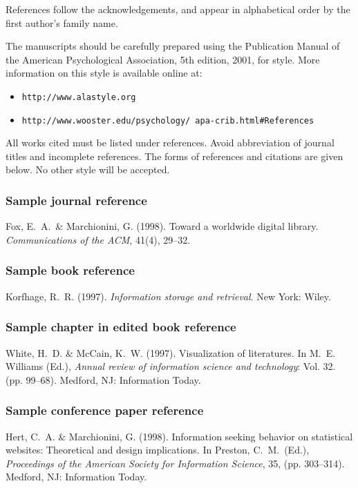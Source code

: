 \documentclass{article} \usepackage{proceed}
\begin{document}
References follow the acknowledgements, and appear in alphabetical
order by the first author's family name.

The manuscripts should be carefully prepared using the Publication
Manual of the American Psychological Association, 5th edition, 2001,
for style.  More information on this style is available online at:
\begin{itemize}
  \item \footnotesize{\texttt{http://www.alastyle.org}}
  \item \footnotesize{\texttt{http://www.wooster.edu/psychology/
        apa-crib.html\#References}}
\end{itemize}
All works cited must be listed under references. Avoid abbreviation of
journal titles and incomplete references. The forms of references and
citations are given below. No other style will be accepted.

\subsubsection*{Sample journal reference}

Fox, E.~A.~\& Marchionini, G. (1998). Toward a worldwide digital
library. \textit{Communications of the ACM}, 41(4), 29--32.

\subsubsection*{Sample book reference}

Korfhage, R.~R. (1997). \textit{Information storage and retrieval}.
New York: Wiley.

\subsubsection*{Sample chapter in edited book reference}

White, H.~D. \& McCain, K.~W. (1997).  Visualization of literatures.
In M.~E. Williams (Ed.), \textit{Annual review of information science
and technology}: Vol. 32. (pp. 99--68).  Medford, NJ: Information
Today.

\subsubsection*{Sample conference paper reference}

Hert, C.~A. \& Marchionini, G.  (1998). Information seeking behavior
on statistical websites: Theoretical and design implications. In
Preston, C.~M.~(Ed.), \textit{Proceedings of the American Society for
Information Science}, 35, (pp. 303--314). Medford, NJ: Information
Today.
\end{document}
